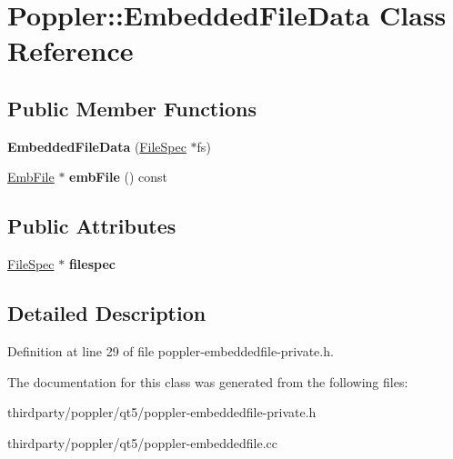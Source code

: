 \hypertarget{class_poppler_1_1_embedded_file_data}{}\section{Poppler\+:\+:Embedded\+File\+Data Class Reference}
\label{class_poppler_1_1_embedded_file_data}
\subsection*{Public Member Functions}
\begin{DoxyCompactItemize}
\item 
\mbox{\label{class_poppler_1_1_embedded_file_data_abd68849ab66254a9e24e90edc65f19f2}} 
{\bfseries Embedded\+File\+Data} (\hyperlink{class_file_spec}{File\+Spec} $\ast$fs)
\item 
\mbox{\label{class_poppler_1_1_embedded_file_data_a206b1b72dbcaeeb1caa4d162446c3a1f}} 
\hyperlink{class_emb_file}{Emb\+File} $\ast$ {\bfseries emb\+File} () const
\end{DoxyCompactItemize}
\subsection*{Public Attributes}
\begin{DoxyCompactItemize}
\item 
\mbox{\label{class_poppler_1_1_embedded_file_data_a7cef94c3642c95485120ca4eeffb54c8}} 
\hyperlink{class_file_spec}{File\+Spec} $\ast$ {\bfseries filespec}
\end{DoxyCompactItemize}


\subsection{Detailed Description}


Definition at line 29 of file poppler-\/embeddedfile-\/private.\+h.



The documentation for this class was generated from the following files\+:\begin{DoxyCompactItemize}
\item 
thirdparty/poppler/qt5/poppler-\/embeddedfile-\/private.\+h\item 
thirdparty/poppler/qt5/poppler-\/embeddedfile.\+cc\end{DoxyCompactItemize}

